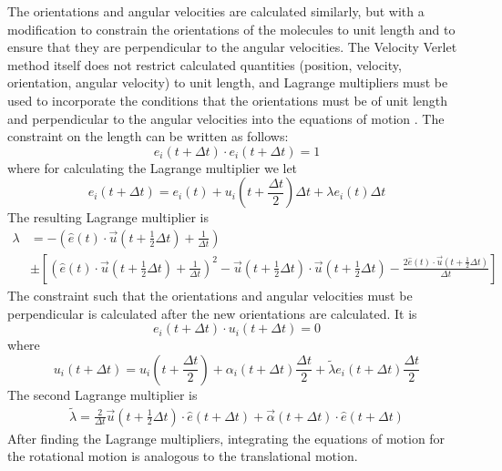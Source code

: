\documentclass[preprint, aps]{revtex4-1}
\begin{document}
The orientations and angular velocities are calculated similarly, but with a
modification to constrain the orientations of the molecules to unit length and
to ensure that they are perpendicular to the angular velocities. The Velocity 
Verlet method itself does not restrict calculated quantities (position, 
velocity, orientation, angular velocity) to unit length, and Lagrange 
multipliers must be used to incorporate the conditions that the orientations
must be of unit length and perpendicular to the angular velocities into the 
equations of motion \cite{allen87}. The constraint on the length can be written as follows:
	\begin{equation} \label{unit-length}
		e_i(t+\Delta t)  \cdot e_i(t+\Delta t) = 1
	\end{equation}
where for calculating the Lagrange multiplier we let
	\begin{equation} \label{vv-e}
		e_i(t+\Delta t) 
		= e_i(t) 
		+ u_i(t + \frac{\Delta t}{2})\Delta t 
		+ \lambda e_i(t) \Delta t
	\end{equation}
The resulting Lagrange multiplier is 
	\begin{equation} \label{lagrange-1}
		\begin{align}
			\lambda 
			& = -\left(\hat{e}(t) 
				\cdot \vec{u}(t+\frac{1}{2}\Delta t)+\frac{1}{\Delta t} 
			\right)\\
			& \pm \left[ 
				\left( \hat{e}(t) \cdot \vec{u}(t+\frac{1}{2}\Delta t)
				+ \frac{1}{\Delta t}
				\right)^2 
				- \vec{u}(t+\frac{1}{2}\Delta t) 
				\cdot \vec{u}(t+\frac{1}{2}\Delta t)
				- \frac{2 \hat{e}(t) \cdot \vec{u}(t+\frac{1}{2}\Delta t)}
				{\Delta t}
			\right]
		\end{align}
	\end{equation}
The constraint such that the orientations and angular velocities must be
perpendicular is calculated after the new orientations are calculated. It is
	\begin{equation} \label{eu-perp}
		e_i(t+\Delta t)  \cdot u_i(t+\Delta t)  = 0
	\end{equation}
where 
	\begin{equation} \label{vv-u}
		u_i(t+\Delta t) = u_i(t+\frac{\Delta t}{2}) 
		+ \alpha_i(t+\Delta t)\frac{\Delta t}{2} 
		+ \tilde{\lambda} e_i(t+\Delta t)\frac{\Delta t}{2}
	\end{equation}
The second Lagrange multiplier is
	\begin{equation} \label{lagrange-2}
		\begin{align}
			\tilde{\lambda} 
			= \frac{2}{\Delta t} \vec{u}(t + \frac{1}{2}\Delta t) 
			\cdot \hat{e}(t+\Delta t) 
			+ \vec{\alpha}(t + \Delta t) \cdot \hat{e} (t + \Delta t)
		\end{align}
	\end{equation}
After finding the Lagrange multipliers, integrating the equations of motion for
the rotational motion is analogous to the translational motion.
\end{document}
